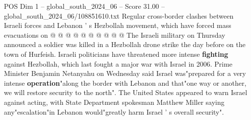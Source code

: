\begin{textsample}{POS Dim 1 – global\_south\_2024\_06 – Score 31.00 – global\_south\_2024\_06/108851610.txt}
Regular cross-border clashes between Israeli forces and Lebanon ' s Hezbollah movement, which have forced mass evacuations on @ @ @ @ @ @ @ @ @ @ The Israeli military on Thursday announced a soldier was killed in a Hezbollah drone strike the day before on the town of Hurfeish.
Israeli politicians have threatened more intense \textbf{fighting} against Hezbollah, which last fought a major war with Israel in 2006.
Prime Minister Benjamin Netanyahu on Wednesday said Israel was"prepared for a very intense \textbf{operation}"along the border with Lebanon and that"one way or another, we will restore security to the north".
The United States appeared to warn Israel against acting, with State Department spokesman Matthew Miller saying any"escalation"in Lebanon would"greatly harm Israel ' s overall security".

\end{textsample}
